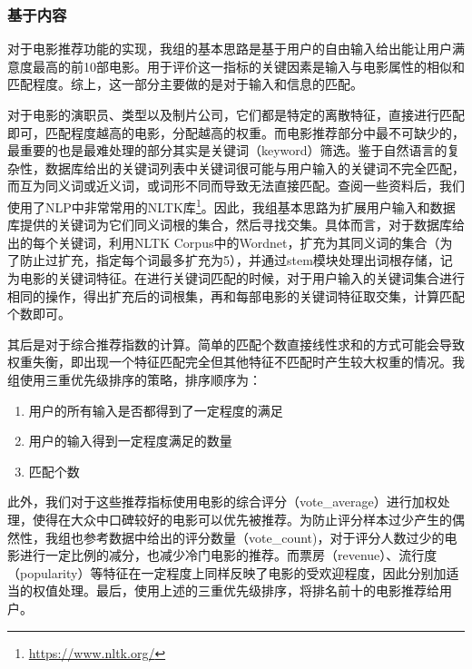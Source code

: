 \documentclass[UTF8]{ctexart}
\begin{document}
\subsubsection{基于内容}
\par 对于电影推荐功能的实现，我组的基本思路是基于用户的自由输入给出能让用户满意度最高的前10部电影。用于评价这一指标的关键因素是输入与电影属性的相似和匹配程度。综上，这一部分主要做的是对于输入和信息的匹配。
\par 对于电影的演职员、类型以及制片公司，它们都是特定的离散特征，直接进行匹配即可，匹配程度越高的电影，分配越高的权重。而电影推荐部分中最不可缺少的，最重要的也是最难处理的部分其实是关键词（keyword）筛选。鉴于自然语言的复杂性，数据库给出的关键词列表中关键词很可能与用户输入的关键词不完全匹配，而互为同义词或近义词，或词形不同而导致无法直接匹配。查阅一些资料后，我们使用了NLP中非常常用的NLTK库\footnote{\href{https://www.nltk.org/}{https://www.nltk.org/}}。因此，我组基本思路为扩展用户输入和数据库提供的关键词为它们同义词根的集合，然后寻找交集。具体而言，对于数据库给出的每个关键词，利用NLTK Corpus中的Wordnet，扩充为其同义词的集合（为了防止过扩充，指定每个词最多扩充为5），并通过stem模块处理出词根存储，记为电影的关键词特征。在进行关键词匹配的时候，对于用户输入的关键词集合进行相同的操作，得出扩充后的词根集，再和每部电影的关键词特征取交集，计算匹配个数即可。
\par 其后是对于综合推荐指数的计算。简单的匹配个数直接线性求和的方式可能会导致权重失衡，即出现一个特征匹配完全但其他特征不匹配时产生较大权重的情况。我组使用三重优先级排序的策略，排序顺序为：
\begin{enumerate}
  \item 用户的所有输入是否都得到了一定程度的满足
  \item 用户的输入得到一定程度满足的数量
  \item 匹配个数
\end{enumerate}
\par 此外，我们对于这些推荐指标使用电影的综合评分（vote\_average）进行加权处理，使得在大众中口碑较好的电影可以优先被推荐。为防止评分样本过少产生的偶然性，我组也参考数据中给出的评分数量（vote\_count)，对于评分人数过少的电影进行一定比例的减分，也减少冷门电影的推荐。而票房（revenue）、流行度（popularity）等特征在一定程度上同样反映了电影的受欢迎程度，因此分别加适当的权值处理。最后，使用上述的三重优先级排序，将排名前十的电影推荐给用户。
\end{document}
